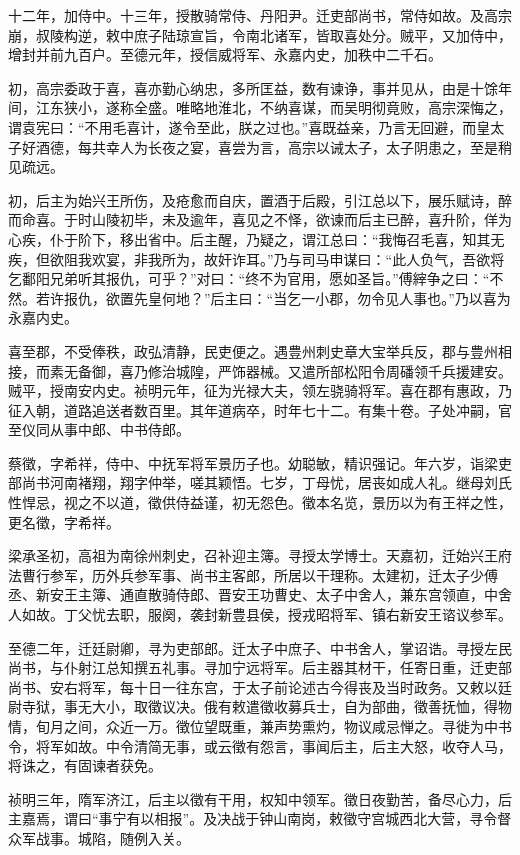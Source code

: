 \documentclass[]{article}
\begin{document}
十二年，加侍中。十三年，授散骑常侍、丹阳尹。迁吏部尚书，常侍如故。及高宗崩，叔陵构逆，敕中庶子陆琼宣旨，令南北诸军，皆取喜处分。贼平，又加侍中，增封并前九百户。至德元年，授信威将军、永嘉内史，加秩中二千石。

初，高宗委政于喜，喜亦勤心纳忠，多所匡益，数有谏诤，事并见从，由是十馀年间，江东狭小，遂称全盛。唯略地淮北，不纳喜谋，而吴明彻竟败，高宗深悔之，谓袁宪曰：``不用毛喜计，遂令至此，朕之过也。''喜既益亲，乃言无回避，而皇太子好酒德，每共幸人为长夜之宴，喜尝为言，高宗以诫太子，太子阴患之，至是稍见疏远。

初，后主为始兴王所伤，及疮愈而自庆，置酒于后殿，引江总以下，展乐赋诗，醉而命喜。于时山陵初毕，未及逾年，喜见之不怿，欲谏而后主已醉，喜升阶，佯为心疾，仆于阶下，移出省中。后主醒，乃疑之，谓江总曰：``我悔召毛喜，知其无疾，但欲阻我欢宴，非我所为，故奸诈耳。''乃与司马申谋曰：``此人负气，吾欲将乞鄱阳兄弟听其报仇，可乎？''对曰：``终不为官用，愿如圣旨。''傅縡争之曰：``不然。若许报仇，欲置先皇何地？''后主曰：``当乞一小郡，勿令见人事也。''乃以喜为永嘉内史。

喜至郡，不受俸秩，政弘清静，民吏便之。遇豊州刺史章大宝举兵反，郡与豊州相接，而素无备御，喜乃修治城隍，严饰器械。又遣所部松阳令周磻领千兵援建安。贼平，授南安内史。祯明元年，征为光禄大夫，领左骁骑将军。喜在郡有惠政，乃征入朝，道路追送者数百里。其年道病卒，时年七十二。有集十卷。子处冲嗣，官至仪同从事中郎、中书侍郎。

蔡徵，字希祥，侍中、中抚军将军景历子也。幼聪敏，精识强记。年六岁，诣梁吏部尚书河南褚翔，翔字仲举，嗟其颖悟。七岁，丁母忧，居丧如成人礼。继母刘氏性悍忌，视之不以道，徵供侍益谨，初无怨色。徵本名览，景历以为有王祥之性，更名徵，字希祥。

梁承圣初，高祖为南徐州刺史，召补迎主簿。寻授太学博士。天嘉初，迁始兴王府法曹行参军，历外兵参军事、尚书主客郎，所居以干理称。太建初，迁太子少傅丞、新安王主簿、通直散骑侍郎、晋安王功曹史、太子中舍人，兼东宫领直，中舍人如故。丁父忧去职，服阕，袭封新豊县侯，授戎昭将军、镇右新安王谘议参军。

至德二年，迁廷尉卿，寻为吏部郎。迁太子中庶子、中书舍人，掌诏诰。寻授左民尚书，与仆射江总知撰五礼事。寻加宁远将军。后主器其材干，任寄日重，迁吏部尚书、安右将军，每十日一往东宫，于太子前论述古今得丧及当时政务。又敕以廷尉寺狱，事无大小，取徵议决。俄有敕遣徵收募兵士，自为部曲，徵善抚恤，得物情，旬月之间，众近一万。徵位望既重，兼声势熏灼，物议咸忌惮之。寻徙为中书令，将军如故。中令清简无事，或云徵有怨言，事闻后主，后主大怒，收夺人马，将诛之，有固谏者获免。

祯明三年，隋军济江，后主以徵有干用，权知中领军。徵日夜勤苦，备尽心力，后主嘉焉，谓曰``事宁有以相报''。及决战于钟山南岗，敕徵守宫城西北大营，寻令督众军战事。城陷，随例入关。
\end{document}
